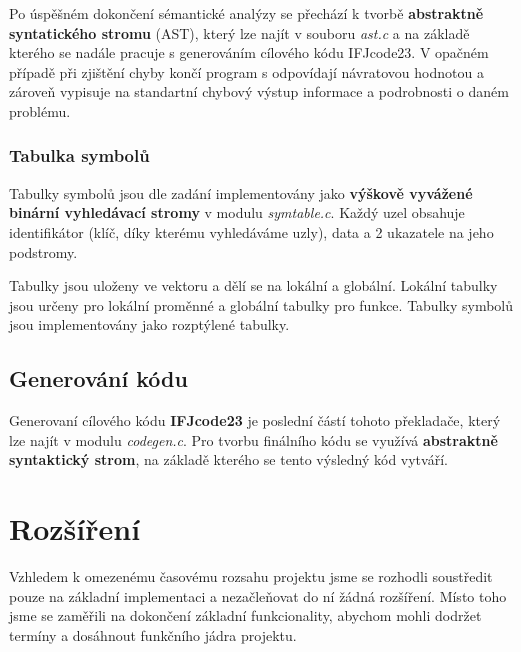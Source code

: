 \documentclass[a4paper, 12pt]{article} %
\begin{document}
            Po úspěšném dokončení sémantické 
            analýzy se přechází k tvorbě \textbf{abstraktně syntatického stromu} (AST), který lze najít v 
            souboru \textit{ast.c} a na základě kterého se nadále pracuje s generováním cílového kódu IFJcode23. 
            V opačném případě při zjištění chyby končí program s odpovídají návratovou hodnotou a 
            zároveň vypisuje na standartní chybový výstup informace a podrobnosti o daném problému.


            \subsubsection{Tabulka symbolů}
                Tabulky symbolů jsou dle zadání implementovány jako \textbf{výškově vyvážené binární 
                vyhledávací stromy}
                v modulu \textit{symtable.c}. Každý uzel obsahuje identifikátor (klíč, díky kterému 
                vyhledáváme uzly), data a 2 ukazatele na jeho podstromy.
                
                Tabulky jsou uloženy ve vektoru a dělí se na lokální a globální. Lokální tabulky jsou
                určeny pro lokální proměnné a globální tabulky pro funkce. Tabulky symbolů jsou 
                implementovány jako rozptýlené tabulky.

        \subsection{Generování kódu}\label{codegen}
            Generovaní cílového kódu \textbf{IFJcode23} je poslední částí tohoto překladače, který lze najít 
            v modulu \textit{codegen.c}. Pro tvorbu finálního kódu se využívá \textbf{abstraktně syntaktický 
            strom}, na základě kterého se tento výsledný kód vytváří. 

        \section{Rozšíření}
            Vzhledem k omezenému časovému rozsahu projektu jsme se rozhodli soustředit pouze na 
            základní implementaci a nezačleňovat do ní žádná rozšíření. Místo toho jsme se zaměřili 
            na dokončení základní funkcionality, abychom mohli dodržet termíny a dosáhnout funkčního 
            jádra projektu.
    
\end{document}
